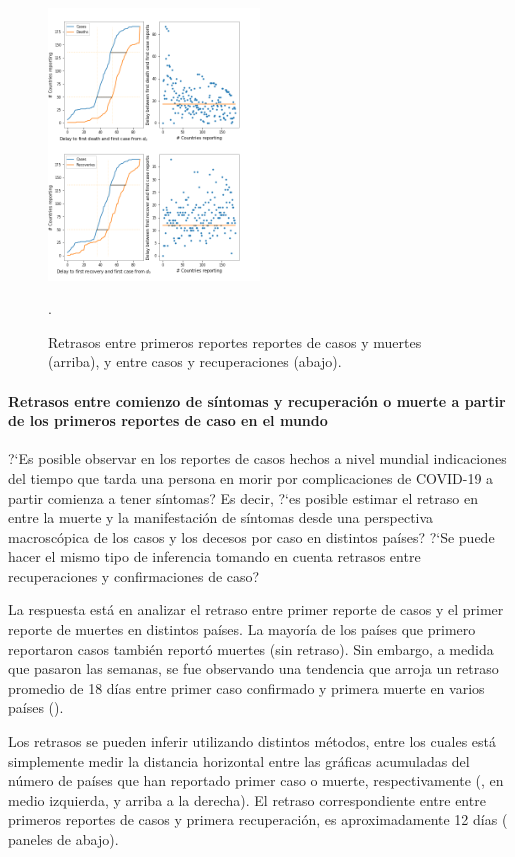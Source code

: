 \documentclass[8pt]{article}
\begin{document}
%
\begin{figure}
\centering
\includegraphics[width=0.5\textwidth]
{figures/dam_COVID19_JHU_delays_caseDeaths}
\caption{Retrasos entre primeros reportes reportes de casos y muertes (arriba),  y entre casos y recuperaciones (abajo). }. \label{fig:reportArrivals}
\end{figure}

\paragraph{Retrasos entre comienzo de síntomas y recuperación o muerte a partir de los primeros reportes de caso en el mundo}

?`Es posible observar en los reportes de casos hechos a nivel mundial indicaciones del tiempo que tarda una persona en morir por complicaciones de COVID-19 a partir comienza a tener síntomas? Es decir, ?`es posible estimar el retraso en entre la muerte y la manifestación de síntomas desde una perspectiva macroscópica de los casos y los decesos por caso en distintos países? ?`Se puede hacer el mismo tipo de inferencia tomando en cuenta retrasos entre recuperaciones y confirmaciones de caso?

La respuesta está en analizar el retraso entre primer reporte de casos y el primer reporte de muertes en distintos países. La mayoría de los países que primero reportaron casos también reportó muertes (sin retraso). Sin embargo, a medida que pasaron las semanas, se fue observando una tendencia que arroja un retraso promedio de 18 días entre primer caso confirmado y primera muerte en varios países (). 

Los retrasos se pueden inferir utilizando distintos métodos, entre los cuales está simplemente medir la distancia horizontal entre las gráficas acumuladas del número de países que han reportado primer caso o muerte, respectivamente (, en medio izquierda, y arriba a la derecha). 
El retraso correspondiente entre entre primeros reportes de casos y primera recuperación, es aproximadamente 12 días  ( paneles de abajo).
\end{document}
